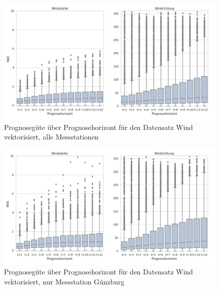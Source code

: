 \documentclass[
12pt, %
toc=listofnumbered, %
toc=chapterentrydotfill, %
numbers=noenddot, %
captions=tableheading, %
bibliography=numbered
]{scrreprt}
\newcommand{\qm}[1]{\glqq#1\grqq{}} %
\begin{document}
\begin{figure}[tph]
	\begin{center}
		\includegraphics[width=\linewidth]{./images/Güte über Prognosehorizont sd via xy-cropped.jpg}
		\caption{Prognosegüte über Prognosehorizont für den Datensatz \qm{Wind vektorisiert, alle Messstationen}}
		\label{fig:güte_über_zeit_xy_all}
	\end{center}
\end{figure}

\begin{figure}[tph]
	\begin{center}
		\includegraphics[width=\linewidth]{./images/Güte über Prognosehorizont sd single-cropped.jpg}
		\caption{Prognosegüte über Prognosehorizont für den Datensatz \qm{Wind vektorisiert, nur Messstation Günzburg}}
		\label{fig:güte_über_zeit_xy_single}
	\end{center}
\end{figure}
\end{document}
